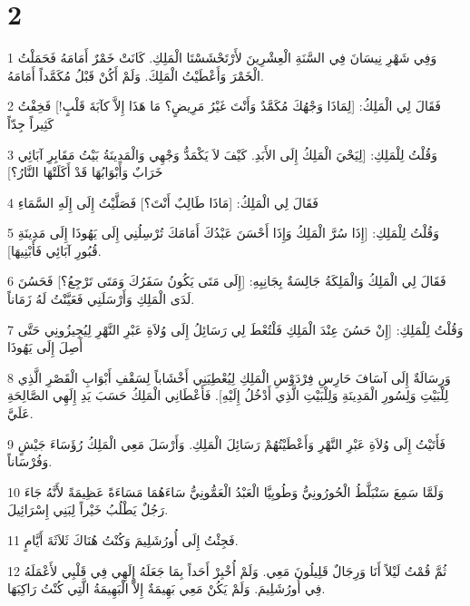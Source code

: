 \chapter{2}

\par 1 وَفِي شَهْرِ نِيسَانَ فِي السَّنَةِ الْعِشْرِينَ لأَرْتَحْشَسْتَا الْمَلِكِ. كَانَتْ خَمْرٌ أَمَامَهُ فَحَمَلْتُ الْخَمْرَ وَأَعْطَيْتُ الْمَلِكَ. وَلَمْ أَكُنْ قَبْلُ مُكَمَّداً أَمَامَهُ.
\par 2 فَقَالَ لِي الْمَلِكُ: [لِمَاذَا وَجْهُكَ مُكَمَّدٌ وَأَنْتَ غَيْرُ مَرِيضٍ؟ مَا هَذَا إِلاَّ كآبَةَ قَلْبٍ!] فَخِفْتُ كَثِيراً جِدّاً
\par 3 وَقُلْتُ لِلْمَلِكِ: [لِيَحْيَ الْمَلِكُ إِلَى الأَبَدِ. كَيْفَ لاَ يَكْمَدُّ وَجْهِي وَالْمَدِينَةُ بَيْتُ مَقَابِرِ آبَائِي خَرَابٌ وَأَبْوَابُهَا قَدْ أَكَلَتْهَا النَّارُ؟]
\par 4 فَقَالَ لِي الْمَلِكُ: [مَاذَا طَالِبٌ أَنْتَ؟] فَصَلَّيْتُ إِلَى إِلَهِ السَّمَاءِ
\par 5 وَقُلْتُ لِلْمَلِكِ: [إِذَا سُرَّ الْمَلِكُ وَإِذَا أَحْسَنَ عَبْدُكَ أَمَامَكَ تُرْسِلُنِي إِلَى يَهُوذَا إِلَى مَدِينَةِ قُبُورِ آبَائِي فَأَبْنِيهَا].
\par 6 فَقَالَ لِي الْمَلِكُ وَالْمَلِكَةُ جَالِسَةٌ بِجَانِبِهِ: [إِلَى مَتَى يَكُونُ سَفَرُكَ وَمَتَى تَرْجِعُ؟] فَحَسُنَ لَدَى الْمَلِكِ وَأَرْسَلَنِي فَعَيَّنْتُ لَهُ زَمَاناً.
\par 7 وَقُلْتُ لِلْمَلِكِ: [إِنْ حَسُنَ عِنْدَ الْمَلِكِ فَلْتُعْطَ لِي رَسَائِلُ إِلَى وُلاَةِ عَبْرِ النَّهْرِ لِيُجِيزُونِي حَتَّى أَصِلَ إِلَى يَهُوذَا
\par 8 وَرِسَالَةٌ إِلَى آسَافَ حَارِسِ فِرْدَوْسِ الْمَلِكِ لِيُعْطِيَنِي أَخْشَاباً لِسَقْفِ أَبْوَابِ الْقَصْرِ الَّذِي لِلْبَيْتِ وَلِسُورِ الْمَدِينَةِ وَلِلْبَيْتِ الَّذِي أَدْخُلُ إِلَيْهِ]. فَأَعْطَانِي الْمَلِكُ حَسَبَ يَدِ إِلَهِي الصَّالِحَةِ عَلَيَّ.
\par 9 فَأَتَيْتُ إِلَى وُلاَةِ عَبْرِ النَّهْرِ وَأَعْطَيْتُهُمْ رَسَائِلَ الْمَلِكِ. وَأَرْسَلَ مَعِي الْمَلِكُ رُؤَسَاءَ جَيْشٍ وَفُرْسَاناً.
\par 10 وَلَمَّا سَمِعَ سَنْبَلَّطُ الْحُورُونِيُّ وَطُوبِيَّا الْعَبْدُ الْعَمُّونِيُّ سَاءَهُمَا مَسَاءَةً عَظِيمَةً لأَنَّهُ جَاءَ رَجُلٌ يَطْلُبُ خَيْراً لِبَنِي إِسْرَائِيلَ.
\par 11 فَجِئْتُ إِلَى أُورُشَلِيمَ وَكُنْتُ هُنَاكَ ثَلاَثَةَ أَيَّامٍ.
\par 12 ثُمَّ قُمْتُ لَيْلاً أَنَا وَرِجَالٌ قَلِيلُونَ مَعِي. وَلَمْ أُخْبِرْ أَحَداً بِمَا جَعَلَهُ إِلَهِي فِي قَلْبِي لأَعْمَلَهُ فِي أُورُشَلِيمَ. وَلَمْ يَكُنْ مَعِي بَهِيمَةٌ إِلاَّ الْبَهِيمَةُ الَّتِي كُنْتُ رَاكِبَهَا.
